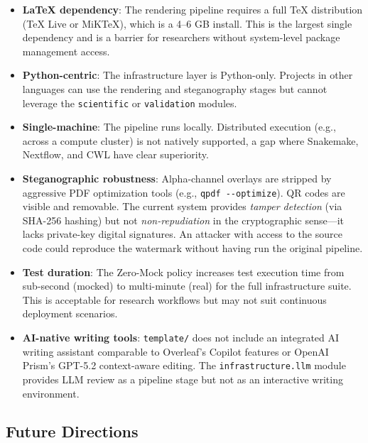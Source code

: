 \documentclass[
]{article}
\providecommand{\tightlist}{%
  \setlength{\itemsep}{0pt}\setlength{\parskip}{0pt}}
\begin{document}
\begin{itemize}
\tightlist
\item
  \textbf{LaTeX dependency}: The rendering pipeline requires a full TeX
  distribution (TeX Live or MiKTeX), which is a 4--6 GB install. This is
  the largest single dependency and is a barrier for researchers without
  system-level package management access.
\item
  \textbf{Python-centric}: The infrastructure layer is Python-only.
  Projects in other languages can use the rendering and steganography
  stages but cannot leverage the \texttt{scientific} or
  \texttt{validation} modules.
\item
  \textbf{Single-machine}: The pipeline runs locally. Distributed
  execution (e.g., across a compute cluster) is not natively supported,
  a gap where Snakemake, Nextflow, and CWL have clear superiority.
\item
  \textbf{Steganographic robustness}: Alpha-channel overlays are
  stripped by aggressive PDF optimization tools (e.g.,
  \texttt{qpdf\ -\/-optimize}). QR codes are visible and removable. The
  current system provides \emph{tamper detection} (via SHA-256 hashing)
  but not \emph{non-repudiation} in the cryptographic sense---it lacks
  private-key digital signatures. An attacker with access to the source
  code could reproduce the watermark without having run the original
  pipeline.
\item
  \textbf{Test duration}: The Zero-Mock policy increases test execution
  time from sub-second (mocked) to multi-minute (real) for the full
  infrastructure suite. This is acceptable for research workflows but
  may not suit continuous deployment scenarios.
\item
  \textbf{AI-native writing tools}: \texttt{template/} does not include
  an integrated AI writing assistant comparable to Overleaf's Copilot
  features or OpenAI Prism's GPT-5.2 context-aware editing. The
  \texttt{infrastructure.llm} module provides LLM review as a pipeline
  stage but not as an interactive writing environment.
\end{itemize}

\newpage

\subsection{Future Directions}\label{future-directions}
\end{document}
